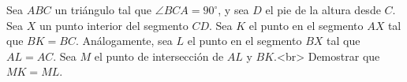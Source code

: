 Sea $ABC$ un triángulo tal que $\angle BCA = 90^{\circ}$, y sea $D$ el pie de la altura desde $C$. Sea $X$ un punto interior del segmento $CD$. Sea $K$ el punto en el segmento $AX$ tal que $BK = BC$. Análogamente, sea $L$ el punto en el segmento $BX$ tal que $AL = AC$. Sea $M$ el punto de intersección de $AL$ y $BK$.<br>
Demostrar que $MK = ML$.
